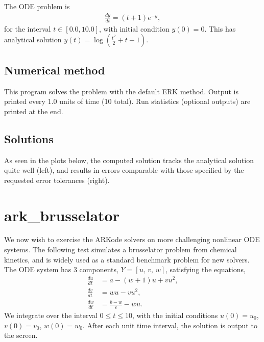\documentclass[letterpaper,10pt,english]{sphinxmanual}
\begin{document}
\sphinxAtStartPar
The ODE problem is
\begin{equation*}
\begin{split}\frac{dy}{dt} = (t+1) e^{-y},\end{split}
\end{equation*}
\sphinxAtStartPar
for the interval \(t \in [0.0, 10.0]\), with initial condition
\(y(0)=0\).  This has analytical solution \(y(t) =
\log\left(\frac{t^2}{2} + t + 1\right)\).


\subsection{Numerical method}
\label{\detokenize{c_serial:id3}}
\sphinxAtStartPar
This program solves the problem with the default ERK method.  Output
is printed every 1.0 units of time (10 total).
Run statistics (optional outputs) are printed at the end.


\subsection{Solutions}
\label{\detokenize{c_serial:id4}}
\sphinxAtStartPar
As seen in the plots below, the computed solution tracks the
analytical solution quite well (left), and results in errors
comparable with those specified by the requested error tolerances
(right).

\noindent{}

\noindent{}


\section{ark\_brusselator}
\label{\detokenize{c_serial:ark-brusselator}}\label{\detokenize{c_serial:id5}}
\sphinxAtStartPar
We now wish to exercise the ARKode solvers on more challenging
nonlinear ODE systems.  The following test simulates a brusselator
problem from chemical kinetics, and is widely used as a standard
benchmark problem for new solvers.  The ODE system has 3 components,
\(Y = [u,\, v,\, w]\), satisfying the equations,
\begin{equation*}
\begin{split}\frac{du}{dt} &= a - (w+1)u + v u^2, \\
\frac{dv}{dt} &= w u - v u^2, \\
\frac{dw}{dt} &= \frac{b-w}{\varepsilon} - w u.\end{split}
\end{equation*}
\sphinxAtStartPar
We integrate over the interval \(0 \le t \le 10\), with the
initial conditions \(u(0) = u_0\), \(v(0) = v_0\), \(w(0)
= w_0\). After each unit time interval, the solution is output to the
screen.
\end{document}

